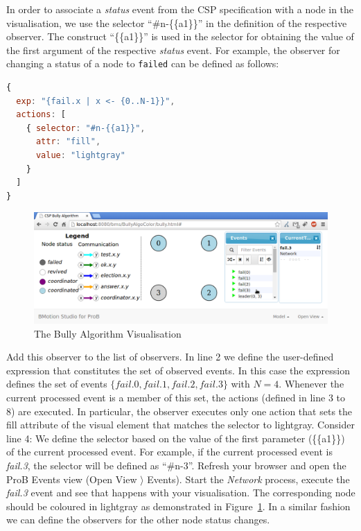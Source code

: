 In order to associate a \textit{status} event from the CSP specification with a node in the visualisation, we use the selector ``\#n-\{\{a1\}\}'' in the definition of the respective observer. 
The construct ``\{\{a1\}\}'' is used in the selector for obtaining the value of the first argument of the respective \textit{status} event.
For example, the observer for changing a status of a node to \texttt{failed} can be defined as follows:

\begin{lstlisting}[language=JavaScript]
{
  exp: "{fail.x | x <- {0..N-1}}",
  actions: [
    { selector: "#n-{{a1}}",
      attr: "fill",
      value: "lightgray"
    }
  ]
}
\end{lstlisting}

\begin{figure}[h!]\centering
	\includegraphics[width=16cm]{img/tutorial/bully1}
	\caption{The Bully Algorithm Visualisation}
	\label{fig:bully1}
\end{figure}

Add this observer to the list of observers.
In line 2 we define the user-defined expression that constitutes the set of observed events.
In this case the expression defines the set of events $\{fail.0, fail.1, fail.2, fail.3\}$ with $N=4$.
Whenever the current processed event is a member of this set, the actions (defined in line 3 to 8) are executed.
In particular, the observer executes only one action that sets the fill attribute of the visual element that matches the selector to lightgray.
Consider line 4: We define the selector based on the value of the first parameter (\{\{a1\}\}) of the current processed event.
For example, if the current processed event is \textit{fail.3}, the selector will be defined as ``\#n-3''.
Refresh your browser and open the ProB Events view (\textsf{Open View $\rangle$ Events}).
Start the \textit{Network} process, execute the \textit{fail.3} event and see that happens with your visualisation.
The corresponding node should be coloured in lightgray as demonstrated in Figure~\ref{fig:bully1}.
In a similar fashion we can define the observers for the other node status changes. 


